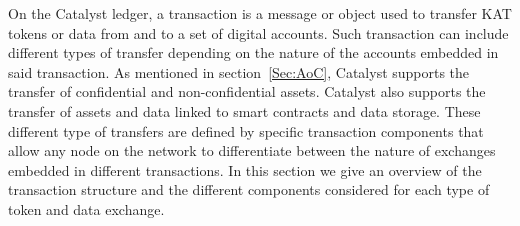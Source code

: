 On the Catalyst ledger, a transaction is a message or object used to transfer KAT tokens or data from and to a set of digital accounts. Such transaction can include different types of transfer depending on the nature of the accounts embedded in said transaction. As mentioned in section~\ref{Sec:AoC}, Catalyst supports the transfer of confidential and non-confidential assets. Catalyst also supports the transfer of assets and data linked to smart contracts and data storage. These different type of transfers are defined by specific transaction components that allow any node on the network to differentiate between the nature of exchanges embedded in different transactions. In this section we give an overview of the transaction structure and the different components considered for each type of token and data exchange.  